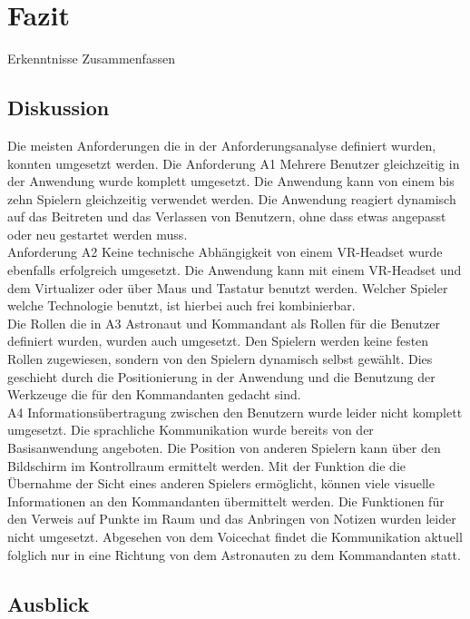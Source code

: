 \section{Fazit}
Erkenntnisse Zusammenfassen 

\subsection{Diskussion} \label{Diskussion}

Die meisten Anforderungen die in der Anforderungsanalyse definiert wurden, konnten umgesetzt werden. Die Anforderung A1 \glqq Mehrere Benutzer gleichzeitig in der Anwendung\grqq{} wurde komplett umgesetzt. Die Anwendung kann von einem bis zehn Spielern gleichzeitig verwendet werden. Die Anwendung reagiert dynamisch auf das Beitreten und das Verlassen von Benutzern, ohne dass etwas angepasst oder neu gestartet werden muss.\\
Anforderung A2 \glqq Keine technische Abhängigkeit von einem VR-Headset\grqq{} wurde ebenfalls erfolgreich umgesetzt. Die Anwendung kann mit einem VR-Headset und dem Virtualizer oder über Maus und Tastatur benutzt werden. Welcher Spieler welche Technologie benutzt, ist hierbei auch frei kombinierbar.\\
Die Rollen die in A3 \glqq Astronaut und Kommandant als Rollen für die Benutzer\grqq{} definiert wurden, wurden auch umgesetzt. Den Spielern werden keine festen Rollen zugewiesen, sondern von den Spielern dynamisch selbst gewählt. Dies geschieht durch die Positionierung in der Anwendung und die Benutzung der Werkzeuge die für den Kommandanten gedacht sind.\\
A4 \glqq Informationsübertragung zwischen den Benutzern\grqq{} wurde leider nicht komplett umgesetzt. Die sprachliche Kommunikation wurde bereits von der Basisanwendung angeboten. Die Position von anderen Spielern kann über den Bildschirm im Kontrollraum ermittelt werden. Mit der Funktion die die Übernahme der Sicht eines anderen Spielers ermöglicht, können viele visuelle Informationen an den Kommandanten übermittelt werden. Die Funktionen für den Verweis auf Punkte im Raum und das Anbringen von Notizen wurden leider nicht umgesetzt. Abgesehen von dem Voicechat findet die Kommunikation aktuell folglich nur in eine Richtung von dem Astronauten zu dem Kommandanten statt.

\subsection{Ausblick} \label{Ausblick}

